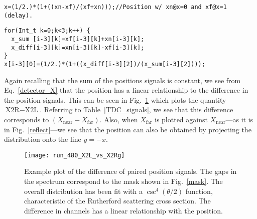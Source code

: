 \vspace{0.5\baselineskip}
\par\noindent
\begin{minipage}{\linewidth}
\singlespace
\begin{lstlisting}[caption={Position definition with simple variables. The variable \texttt{xn} refers to the near side of the detector and \texttt{xf} refers to the far side of the detector.}]
x=(1/2.)*(1+((xn-xf)/(xf+xn)));//Position w/ xn@x=0 and xf@x=1 (delay).
\end{lstlisting}
\end{minipage}
\vspace{0.5\baselineskip}
\par\noindent
\begin{minipage}{\linewidth}
\singlespace
\begin{lstlisting}[caption={Position definition with arrayed variables. Here the index \texttt{i} runs from 3--6 to cover the four pairs of positions. Each variable is a $4\times3$ array. The first index \texttt{i-3} corresponds to each position. The second index \texttt{k} corresponds to the calibration level: 0 for uncalibrated, 1 for partially calibrated, and 2 for fully calibrated.}]
for(Int_t k=0;k<3;k++) {
  x_sum [i-3][k]=xf[i-3][k]+xn[i-3][k];
  x_diff[i-3][k]=xn[i-3][k]-xf[i-3][k];
}
x[i-3][0]=(1/2.)*(1+((x_diff[i-3][2])/(x_sum[i-3][2])));
\end{lstlisting}
\end{minipage}

Again recalling that the sum of the positions signals is constant, we see from Eq.~\ref{detector_X} that the position 
has a linear relationship to the difference in the position signals.  This can be seen in Fig.~\ref{hdiffz} which plots the quantity $\textrm{X2R}-\textrm{X2L}$.  Referring to Table~\ref{TDC_signals}, we see that this difference corresponds to $(X_\mathrm{near}-X_\mathrm{far})$.  Also, when $X_\mathrm{far}$ is plotted against $X_\mathrm{near}$---as it is in Fig.~\ref{reflect}---we see that the position can also be obtained by projecting the distribution onto the line $y=-x$.
\begin{figure}
\centering
\texttt{[image: run\_480\_X2L\_vs\_X2Rg]}
\caption{Example plot of the difference of paired position signals.  The gaps in the spectrum correspond to the mask shown in Fig.~\ref{mask}.  The overall distribution has been fit with a
$\csc^4 (\theta/2)$ function, characteristic of the Rutherford scattering cross section.
 The difference in channels has a linear relationship with the position.}%
\label{hdiffz}%
\end{figure}

